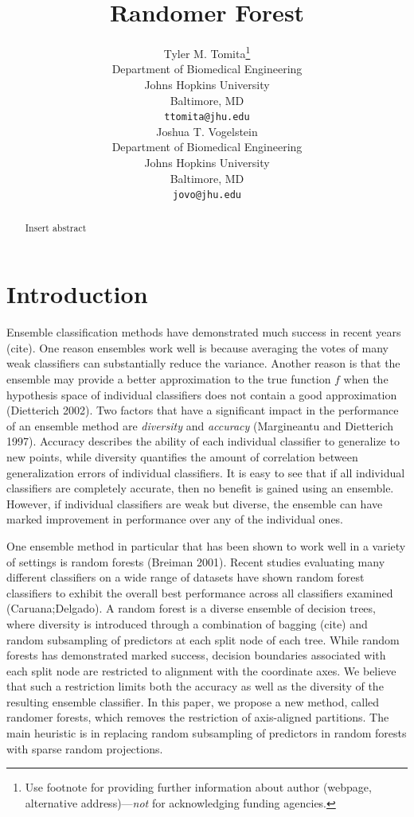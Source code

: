\documentclass{article} %
\title{Randomer Forest}
\author{
Tyler M. Tomita\thanks{ Use footnote for providing further information
about author (webpage, alternative address)---\emph{not} for acknowledging
funding agencies.} \\
Department of Biomedical Engineering\\
Johns Hopkins University\\
Baltimore, MD \\
\texttt{ttomita@jhu.edu} \\
\And
Joshua T. Vogelstein \\
Department of Biomedical Engineering \\
Johns Hopkins University \\
Baltimore, MD \\
\texttt{jovo@jhu.edu} \\
}
\begin{document}
\maketitle

\begin{abstract}
Insert abstract
\end{abstract}

\section{Introduction}
Ensemble classification methods have demonstrated much success in recent years (cite). One reason ensembles work well is because averaging the votes of many weak classifiers can substantially reduce the variance. Another reason is that the ensemble may provide a better approximation to the true function $f$ when the hypothesis space of individual classifiers does not contain a good approximation (Dietterich 2002). Two factors that have a significant impact in the performance of an ensemble method are \textit{diversity} and \textit{accuracy} (Margineantu and Dietterich 1997). Accuracy describes the ability of each individual classifier to generalize to new points, while diversity quantifies the amount of correlation between generalization errors of individual classifiers. It is easy to see that if all individual classifiers are completely accurate, then no benefit is gained using an ensemble. However, if individual classifiers are weak but diverse, the ensemble can have marked improvement in performance over any of the individual ones.

One ensemble method in particular that has been shown to work well in a variety of settings is random forests (Breiman 2001). Recent studies evaluating many different classifiers on a wide range of datasets have shown random forest classifiers to exhibit the overall best performance across all classifiers examined (Caruana;Delgado). A random forest is a diverse ensemble of decision trees, where diversity is introduced through a combination of bagging (cite) and random subsampling of predictors at each split node of each tree. While random forests has demonstrated marked success, decision boundaries associated with each split node are restricted to alignment with the coordinate axes. We believe that such a restriction limits both the accuracy as well as the diversity of the resulting ensemble classifier. In this paper, we propose a new method, called randomer forests, which removes the restriction of axis-aligned partitions. The main heuristic is in replacing random subsampling of predictors in random forests with sparse random projections. 
\end{document}
